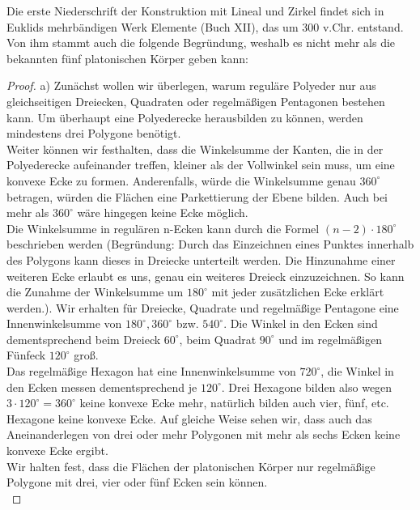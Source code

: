 Die erste Niederschrift der Konstruktion mit Lineal und Zirkel findet sich in Euklids mehrbändigen Werk Elemente (Buch XII), das um 300 v.Chr. entstand. Von ihm stammt auch die folgende Begründung, weshalb es nicht mehr als die bekannten fünf platonischen Körper geben kann:
\begin{proof}
a) Zunächst wollen wir überlegen, warum reguläre Polyeder nur aus gleichseitigen Dreiecken, Quadraten oder regelmäßigen Pentagonen bestehen kann. Um überhaupt eine Polyederecke herausbilden zu können, werden mindestens drei Polygone benötigt. \\
Weiter können wir festhalten, dass die Winkelsumme der Kanten, die in der Polyederecke aufeinander treffen, kleiner als der Vollwinkel sein muss, um eine konvexe Ecke zu formen. Anderenfalls, würde die Winkelsumme genau $360^\circ$ betragen, würden die Flächen eine Parkettierung der Ebene bilden. Auch bei mehr als $360^\circ$ wäre hingegen keine Ecke möglich.\\
Die Winkelsumme in regulären n-Ecken kann durch die Formel $(n-2)\cdot 180^\circ$ beschrieben werden (Begründung: Durch das Einzeichnen eines Punktes innerhalb des Polygons kann dieses in Dreiecke unterteilt werden. Die Hinzunahme einer weiteren Ecke erlaubt es uns, genau ein weiteres Dreieck einzuzeichnen. So kann die Zunahme der Winkelsumme um $180^\circ$ mit jeder zusätzlichen Ecke erklärt werden.). Wir erhalten für Dreiecke, Quadrate und regelmäßige Pentagone eine Innenwinkelsumme von $180^\circ, 360^\circ$ bzw. $540^\circ$. Die Winkel in den Ecken sind dementsprechend beim Dreieck $60^\circ$, beim Quadrat $90^\circ$ und im regelmäßigen Fünfeck $120^\circ$ groß. \\
Das regelmäßige Hexagon hat eine Innenwinkelsumme von $720^\circ$, die Winkel in den Ecken messen dementsprechend je $120^\circ$. Drei Hexagone bilden also wegen $3\cdot 120^\circ=360^\circ$ keine konvexe Ecke mehr, natürlich bilden auch vier, fünf, etc. Hexagone keine konvexe Ecke. Auf gleiche Weise sehen wir, dass auch das Aneinanderlegen von drei oder mehr Polygonen mit mehr als sechs Ecken keine konvexe Ecke ergibt.\\
Wir halten fest, dass die Flächen der platonischen Körper nur regelmäßige Polygone mit drei, vier oder fünf Ecken sein können.\\


\end{proof}
